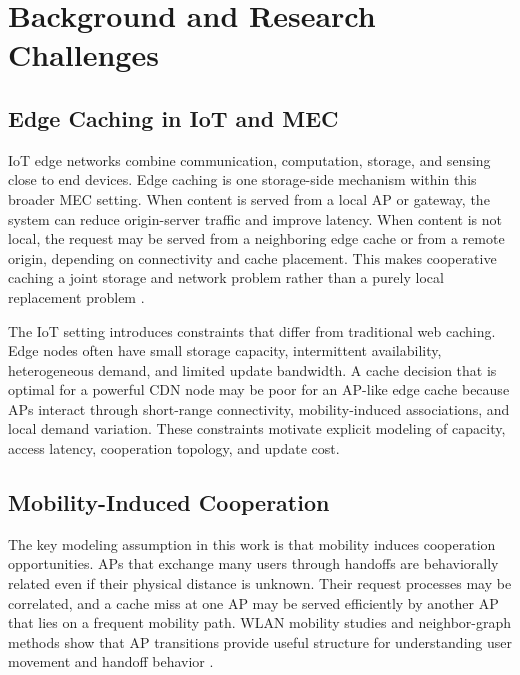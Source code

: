 \section{Background and Research Challenges}

\subsection{Edge Caching in IoT and MEC}

IoT edge networks combine communication, computation, storage, and sensing close to end devices. Edge caching is one storage-side mechanism within this broader MEC setting. When content is served from a local AP or gateway, the system can reduce origin-server traffic and improve latency. When content is not local, the request may be served from a neighboring edge cache or from a remote origin, depending on connectivity and cache placement. This makes cooperative caching a joint storage and network problem rather than a purely local replacement problem \cite{Mao2017MEC,Paschos2018RoleCaching,Li2018CachingSurvey}.

The IoT setting introduces constraints that differ from traditional web caching. Edge nodes often have small storage capacity, intermittent availability, heterogeneous demand, and limited update bandwidth. A cache decision that is optimal for a powerful CDN node may be poor for an AP-like edge cache because APs interact through short-range connectivity, mobility-induced associations, and local demand variation. These constraints motivate explicit modeling of capacity, access latency, cooperation topology, and update cost.

\subsection{Mobility-Induced Cooperation}

The key modeling assumption in this work is that mobility induces cooperation opportunities. APs that exchange many users through handoffs are behaviorally related even if their physical distance is unknown. Their request processes may be correlated, and a cache miss at one AP may be served efficiently by another AP that lies on a frequent mobility path. WLAN mobility studies and neighbor-graph methods show that AP transitions provide useful structure for understanding user movement and handoff behavior \cite{kim2005mobility_wifi_ap,shin2004neighbor_graphs,c71593-22,kotz_dartmouth_campus_2009}.

